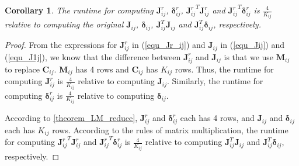 \documentclass{vgtc}                          %
\newtheorem{corollary}{Corollary}[theorem]
\begin{document}
\begin{corollary} \label{corollary_reduce_time}
The runtime for computing $\mathbf{J}_{ij}^r$, $\bm{\delta}_{ij}^r$, ${\mathbf{J}_{ij}^{r}}^{T}\mathbf{J}_{ij}^{r}$ and ${\mathbf{J}_{ij}^{r}}^{T}\bm{\delta}_{ij}^r$ is  $\frac{4}{K_{ij}}$ relative to computing  the original $\mathbf{J}_{ij}$, $\bm{\delta}_{ij}$, $\mathbf{J}_{ij}^{T}\mathbf{J}_{ij}$ and $\mathbf{J}_{ij}^{T}\bm{\delta}_{ij}$, respectively. %
\end{corollary}
\begin{proof}
	From the expressions for $\mathbf{J}^{r}_{ij}$ in (\ref{equ_Jr_ij}) and $\mathbf{J}_{ij}$ in (\ref{equ_Jij}) and (\ref{equ_J1j}), we know that the difference between $\mathbf{J}^{r}_{ij}$ and  $\mathbf{J}_{ij}$ is that we use $\mathbf{M}_{ij}$ to replace $\mathbf{C}_{ij}$. $\mathbf{M}_{ij}$ has 4 rows and  $\mathbf{C}_{ij}$ has $K_{ij}$ rows. Thus, the runtime for computing $\mathbf{J}^{r}_{ij}$ is $\frac{4}{K_{ij}}$  relative to computing $\mathbf{J}_{ij}$. Similarly, the runtime for computing $\bm{\delta}^{r}_{ij}$ is $\frac{4}{K_{ij}}$  relative to computing $\bm{\delta}_{ij}$.

According to \autoref{theorem_LM_reduce}, $\mathbf{J}_{ij}^{r}$ and $\bm{\delta}_{ij}^{r}$ each has 4 rows, and $\mathbf{J}_{ij}$ and $\bm{\delta}_{ij}$ each  has $K_{ij}$ rows. According to the rules of matrix multiplication,   the runtime for computing ${\mathbf{J}_{ij}^{r}}^{T}\mathbf{J}_{ij}^{r}$ and ${\mathbf{J}_{ij}^{r}}^{T}\bm{\delta}_{ij}^r$ is $\frac{4}{K_{ij}}$ relative to computing  $\mathbf{J}_{ij}^{T}\mathbf{J}_{ij}$ and $\mathbf{J}_{ij}^{T}\bm{\delta}_{ij}$, respectively.
\end{proof}
\end{document}

